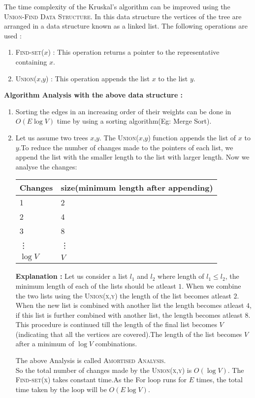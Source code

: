 \documentclass[12pt]{article}
\theoremstyle{plain}
\begin{document}
The time complexity of the Kruskal's algorithm can be improved using the \textsc{Union-Find Data Structure}.
In this data structure the vertices of the tree are arranged in a data structure known as a linked list.
The following operations are used :
\begin{enumerate}
\item \textsc{Find-set($x$) :} This operation returns a pointer to the representative containing $x$.
\item \textsc{Union($x$,$y$) :} This operation appends the list $x$ to the list $y$.
\end{enumerate}
\textbf{Algorithm Analysis with the above data structure :}
 \begin{enumerate}
\item Sorting the edges in an increasing order of their weights can be done in $O(E \log V)$ time by using a sorting algorithm(Eg: Merge Sort).
\item Let us assume two trees $x$,$y$. The  \textsc{Union($x$,$y$)} function appends the list of $x $ to $y$.To reduce the number of changes made to the pointers of each list, we append the list with the smaller length to the list with larger length.
Now we analyse the changes:

\begin{center}
\begin{tabular}{|l|l|}
\hline 
Changes & size(minimum length after appending)\\
\hline

1&2\\
2&4\\
3&8\\
\vdots & \vdots \\
$\log V$ & $ V$\\
\hline
\end{tabular}
\end{center}
\textbf{Explanation :}
Let us consider a list $l_1$ and  $l_2$ where length of $l_1 \leq l_2$, the minimum length of each of the lists should be atleast $1$. When we combine the two lists using the \textsc{Union(x,y)} the length of the list becomes atleast $2$. When the new list is combined with another list the length becomes atleast $4$, if this list is further combined with another list, the length becomes atleast $8$. This procedure is continued till the length of the final list becomes $V$ (indicating that all the vertices are covered).The length of the list becomes $V$ after a minimum of $\log V$ combinations.

The above Analysis is called \textsc{Amortised Analysis}.\\

So the total number of changes made by the \textsc{Union(x,y)} is $O(\log V)$. The \textsc{Find-set(x)} takes constant time.As the For loop runs for $E$ times, the total time taken by the loop will be $O(E\log V)$.
\end{enumerate}
\end{document}

